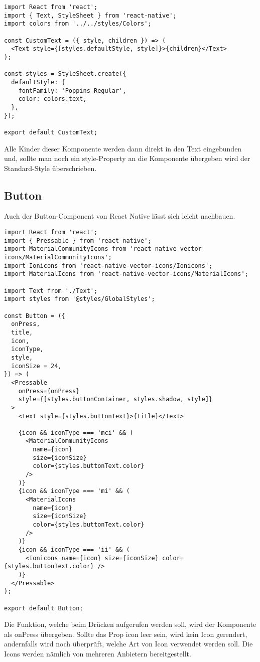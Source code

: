 \begin{lstlisting}
import React from 'react';
import { Text, StyleSheet } from 'react-native';
import colors from '../../styles/Colors';

const CustomText = ({ style, children }) => (
  <Text style={[styles.defaultStyle, style]}>{children}</Text>
);

const styles = StyleSheet.create({
  defaultStyle: {
    fontFamily: 'Poppins-Regular',
    color: colors.text,
  },
});

export default CustomText;
\end{lstlisting}

Alle Kinder dieser Komponente werden dann direkt in den Text eingebunden und, sollte man noch ein
style-Property an die Komponente übergeben wird der Standard-Style überschrieben.

\newpage
\subsection{Button}
Auch der Button-Component von React Native lässt sich leicht nachbauen.

\begin{lstlisting}
import React from 'react';
import { Pressable } from 'react-native';
import MaterialCommunityIcons from 'react-native-vector-icons/MaterialCommunityIcons';
import Ionicons from 'react-native-vector-icons/Ionicons';
import MaterialIcons from 'react-native-vector-icons/MaterialIcons';

import Text from './Text';
import styles from '@styles/GlobalStyles';

const Button = ({
  onPress,
  title,
  icon,
  iconType,
  style,
  iconSize = 24,
}) => (
  <Pressable
    onPress={onPress}
    style={[styles.buttonContainer, styles.shadow, style]}
  >
    <Text style={styles.buttonText}>{title}</Text>

    {icon && iconType === 'mci' && (
      <MaterialCommunityIcons
        name={icon}
        size={iconSize}
        color={styles.buttonText.color}
      />
    )}
    {icon && iconType === 'mi' && (
      <MaterialIcons
        name={icon}
        size={iconSize}
        color={styles.buttonText.color}
      />
    )}
    {icon && iconType === 'ii' && (
      <Ionicons name={icon} size={iconSize} color={styles.buttonText.color} />
    )}
  </Pressable>
);

export default Button;
\end{lstlisting}

Die Funktion, welche beim Drücken aufgerufen werden soll, wird der Komponente als onPress übergeben.
Sollte das Prop icon leer sein, wird kein Icon gerendert, andernfalls wird noch überprüft, welche
Art von Icon verwendet werden soll. Die Icons werden nämlich von mehreren Anbietern bereitgestellt.

